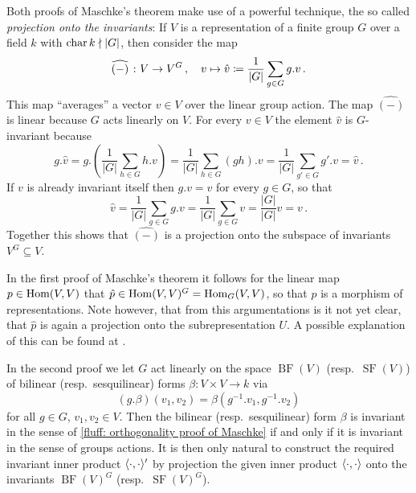 \begin{remark}
  \label{remark: projection onto invariants}
  Both proofs of Maschke’s theorem make use of a powerful technique, the so called \emph{projection onto the invariants}:
  If $V$ is a representation of a finite group $G$ over a field $k$ with $\operatorname{char} k \nmid |G|$, then consider the map
  \[
              \widehat{(-)} \;
    \colon    V
    \to       V^G \,,
    \quad     v
    \mapsto   \hat{v}
    \coloneqq  \frac{1}{|G|} \sum_{g \in G} g.v \,.
  \]
  This map “averages” a vector $v \in V$ over the linear group action.
  The map $\widehat{(-)}$ is linear because $G$ acts linearly on $V$.
  For every $v \in V$ the element $\hat{v}$ is $G$-invariant because
  \[
      g.\hat{v}
    = g.\left( \frac{1}{|G|} \sum_{h \in G} h.v \right)
    = \frac{1}{|G|} \sum_{h \in G} (gh).v
    = \frac{1}{|G|} \sum_{g' \in G} g'.v
    = \hat{v} \,.
  \]
  If $v$ is already invariant itself then $g.v = v$ for every $g \in G$, so that
  \[
      \hat{v}
    = \frac{1}{|G|} \sum_{g \in G} g.v
    = \frac{1}{|G|} \sum_{g \in G} v
    = \frac{|G|}{|G|} v
    = v \,.
  \]
  Together this shows that $\widehat{(-)}$ is a projection onto the subspace of invariants $V^G \subseteq V$.
  
  In the first proof of Maschke’s theorem it follows for the linear map $p \in \operatorname{Hom}(V,V)$ that $\hat{p} \in \operatorname{Hom}(V,V)^G = \operatorname{Hom}_G(V,V)$, so that $\hat{p}$ is a morphism of representations.
  Note however, that from this argumentations is it not yet clear, that $\hat{p}$ is again a projection onto the subrepresentation $U$.
  A possible explanation of this can be found at \cite{MS2644102}.
  
  In the second proof we let $G$ act linearly on the space $\operatorname{BF}(V)$ (resp.\ $\operatorname{SF}(V)$) of bilinear (resp.\ sesquilinear) forms $\beta \colon V \times V \to k$ via
  \[
      (g.\beta)(v_1, v_2)
    = \beta\left( g^{-1}.v_1, g^{-1}.v_2 \right)
  \]
  for all $g \in G$, $v_1, v_2 \in V$.
  Then the bilinear (resp.\ sesquilinear) form $\beta$ is invariant in the sense of \ref{fluff: orthogonality proof of Maschke} if and only if it is invariant in the sense of groups actions.
  It is then only natural to construct the required invariant inner product $\langle \cdot, \cdot \rangle'$ by projection the given inner product $\langle \cdot, \cdot \rangle$ onto the invariants $\operatorname{BF}(V)^G$ (resp.\ $\operatorname{SF}(V)^G$).
\end{remark}





